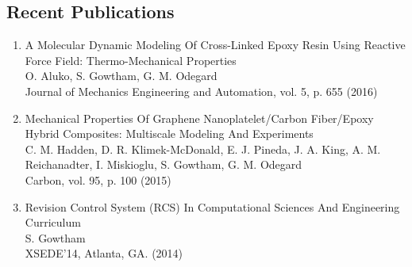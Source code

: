 %
\subsection*{Recent Publications}

\begin{enumerate}
  \item \textsf{A Molecular Dynamic Modeling Of Cross-Linked Epoxy Resin Using Reactive Force Field: Thermo-Mechanical Properties} \\ 
        O. Aluko, S. Gowtham, G. M. Odegard\\
        Journal of Mechanics Engineering and Automation, vol. 5, p. 655 (2016)

  \item \textsf{Mechanical Properties Of Graphene Nanoplatelet/Carbon Fiber/Epoxy Hybrid Composites: Multiscale Modeling And Experiments} \\ 
        C. M. Hadden, D. R. Klimek-McDonald, E. J. Pineda, J. A. King, 
        A. M. Reichanadter, I. Miskioglu, S. Gowtham, G. M. Odegard \\
        Carbon, vol. 95, p. 100 (2015) 

  \item \textsf{Revision Control System (RCS) In Computational Sciences And Engineering Curriculum} \\ 
        S. Gowtham \\
        XSEDE'14, Atlanta, GA. (2014) 
\end{enumerate}
